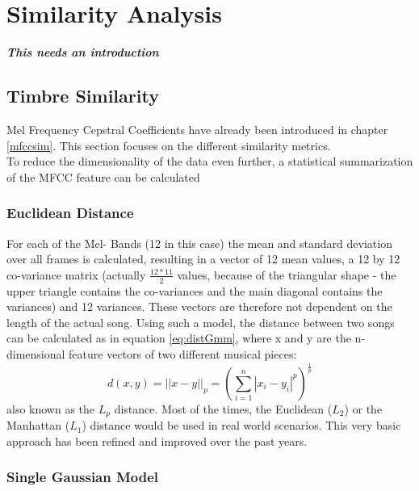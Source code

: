 
\chapter{Similarity Analysis}

\textit{\textbf{This needs an introduction}}

\section{Timbre Similarity} \label{musly}

Mel Frequency Cepstral Coefficients have already been introduced in chapter \ref{mfccsim}. This section focuses on the different similarity metrics.\\
To reduce the dimensionality of the data even further, a statistical summarization of the MFCC feature can be calculated \cite[pp. 51ff]{knees1}\\


\subsection{Euclidean Distance}

For each of the Mel- Bands (12 in this case) the mean and standard deviation over all frames is calculated, resulting in a vector of 12 mean values, a 12 by 12 co-variance matrix (actually $\frac{12*11}{2}$ values, because of the triangular shape - the upper triangle contains the co-variances and the main diagonal contains the variances) and 12 variances. These vectors are therefore not dependent on the length of the actual song. 
Using such a model, the distance between two songs can be calculated as in equation \ref{eq:distGmm}, where x and y are the n-dimensional feature vectors of two different musical pieces:
\begin{equation} \label{eq:distGmm}
d(x, y) = ||x - y||_p = \left(\sum_{i=1}^{n}{|x_i - y_i|^p}\right)^{\frac{1}{p}}
\end{equation}
also known as the $L_p$ distance. Most of the times, the Euclidean ($L_2$) or the Manhattan ($L_1$) distance would be used in real world scenarios.
This very basic approach has been refined and improved over the past years. 

\subsection{Single Gaussian Model}

